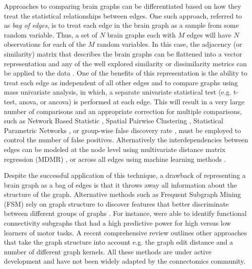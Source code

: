 \documentclass{bmcart}
\begin{document}
Approaches to comparing brain graphs can be differentiated based on how they treat the statistical relationships between edges. One such approach, referred to as \emph{bag of edges}, is to treat each edge in the brain graph as a sample from some random variable. Thus, a set of $N$ brain graphs each with $M$ edges will have $N$ observations for each of the $M$ random variables. In this case, the adjacency (or similarity) matrix that describes the brain graphs can be flattened into a vector representation and any of the well explored similarity or dissimilarity metrics can be applied to the data \cite{Craddock2013}. One of the benefits of this representation is the ability to treat each edge as independent of all other edges and to compare graphs using mass univariate analysis, in which, a separate univariate statistical test (e.g. t-test, anova, or ancova) is performed at each edge. This will result in a very large number of comparisons and an appropriate correction for multiple comparisons, such as Network Based Statistic \cite{Zalesky2012}, Spatial Pairwise Clustering \cite{Zalesky2012}, Statistical Parametric Networks \cite{Ginestat2011}, or group-wise false discovery rate  \cite{Benjamini2001}, must be employed to control the number of false positives. Alternatively the interdependencies between edges can be modeled at the node level using multivariate distance matrix regression (MDMR) \cite{Shehzad2014}, or across all edges using machine learning methods \cite{Craddock2009, Dosenbach2010, Richiardi2011}.

Despite the successful application of this technique, a drawback of representing a brain graph as a bag of edges is that it throws away all information about the structure of the graph. Alternative methods such as Frequent Subgraph Mining (FSM) rely on graph structure to discover features that better discriminate between different groups of graphs \cite{Thoma2010}. For instance, \cite{Bogdanov2014} were able to identify functional connectivity subgraphs that had a high predictive power for high versus low learners of motor tasks. A recent comprehensive review \cite{Richiardi2013} outlines other approaches that take the graph structure into account e.g. the graph edit distance and a number of different graph kernels. All these methods are under active development and have not been widely adapted by the connectomics community.
\end{document}
